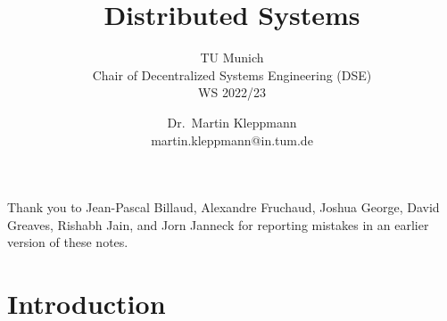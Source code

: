 \newcommand{\thisyear}{WS 2022/23}
\newcommand{\timestampexample}{2021-11-09T09:50:17+00:00}

\newcommand{\mydetails}{%
    Dr.\ Martin Kleppmann\\
    martin.kleppmann@in.tum.de\\[1em]
    TU Munich\\
    Chair of Decentralized Systems Engineering\\
    \url{https://dse.in.tum.de/}%
}



\title{Distributed Systems}
\subtitle{TU Munich\\Chair of Decentralized Systems Engineering (DSE)\\\thisyear}
\author{Dr.\ Martin Kleppmann\\martin.kleppmann@in.tum.de}
\date{}
\maketitle
\tableofcontents

\vspace{10pt}\noindent Thank you to Jean-Pascal Billaud, Alexandre Fruchaud, Joshua George, David Greaves, Rishabh Jain, and Jorn Janneck for reporting mistakes in an earlier version of these notes.

\def\sectionautorefname{Section}%
\def\subsectionautorefname{Section}%
\def\subsubsectionautorefname{Section}%

\newpage
\section{Introduction}\label{sec:introduction}

